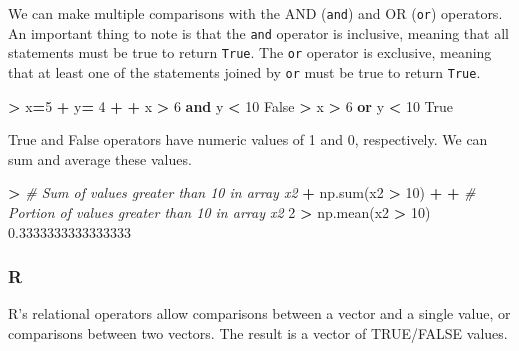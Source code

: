 \documentclass[
]{book}
\newenvironment{Shaded}{\begin{snugshade}}{\end{snugshade}}
\newcommand{\BuiltInTok}[1]{#1}
\newcommand{\CommentTok}[1]{\textcolor[rgb]{0.56,0.35,0.01}{\textit{#1}}}
\newcommand{\DecValTok}[1]{\textcolor[rgb]{0.00,0.00,0.81}{#1}}
\newcommand{\FloatTok}[1]{\textcolor[rgb]{0.00,0.00,0.81}{#1}}
\newcommand{\KeywordTok}[1]{\textcolor[rgb]{0.13,0.29,0.53}{\textbf{#1}}}
\newcommand{\NormalTok}[1]{#1}
\newcommand{\OperatorTok}[1]{\textcolor[rgb]{0.81,0.36,0.00}{\textbf{#1}}}
\newcommand{\VariableTok}[1]{\textcolor[rgb]{0.00,0.00,0.00}{#1}}
\begin{document}
We can make multiple comparisons with the AND (\texttt{and}) and OR (\texttt{or}) operators. An important thing to note is that the \texttt{and} operator is inclusive, meaning that all statements must be true to return \texttt{True}. The \texttt{or} operator is exclusive, meaning that at least one of the statements joined by \texttt{or} must be true to return \texttt{True}.

\begin{Shaded}
\begin{Highlighting}[]
\OperatorTok{\textgreater{}}\NormalTok{ x}\OperatorTok{=}\DecValTok{5} 
\OperatorTok{+}\NormalTok{ y}\OperatorTok{=} \DecValTok{4}
\OperatorTok{+} 
\OperatorTok{+}\NormalTok{ x }\OperatorTok{\textgreater{}} \DecValTok{6} \KeywordTok{and}\NormalTok{ y }\OperatorTok{\textless{}} \DecValTok{10}
\VariableTok{False}
\OperatorTok{\textgreater{}}\NormalTok{ x }\OperatorTok{\textgreater{}} \DecValTok{6} \KeywordTok{or}\NormalTok{ y }\OperatorTok{\textless{}} \DecValTok{10}
\VariableTok{True}
\end{Highlighting}
\end{Shaded}

True and False operators have numeric values of 1 and 0, respectively. We can sum and average these values.

\begin{Shaded}
\begin{Highlighting}[]
\OperatorTok{\textgreater{}} \CommentTok{\# Sum of values greater than 10 in array x2}
\OperatorTok{+}\NormalTok{ np.}\BuiltInTok{sum}\NormalTok{(x2 }\OperatorTok{\textgreater{}} \DecValTok{10}\NormalTok{)}
\OperatorTok{+} 
\OperatorTok{+} \CommentTok{\# Portion of values greater than 10 in array x2}
\DecValTok{2}
\OperatorTok{\textgreater{}}\NormalTok{ np.mean(x2 }\OperatorTok{\textgreater{}} \DecValTok{10}\NormalTok{)}
\FloatTok{0.3333333333333333}
\end{Highlighting}
\end{Shaded}

\hypertarget{r-4}{%
\subsubsection*{R}\label{r-4}}

R's relational operators allow comparisons between a vector and a single value, or comparisons between two vectors. The result is a vector of TRUE/FALSE values.
\end{document}
